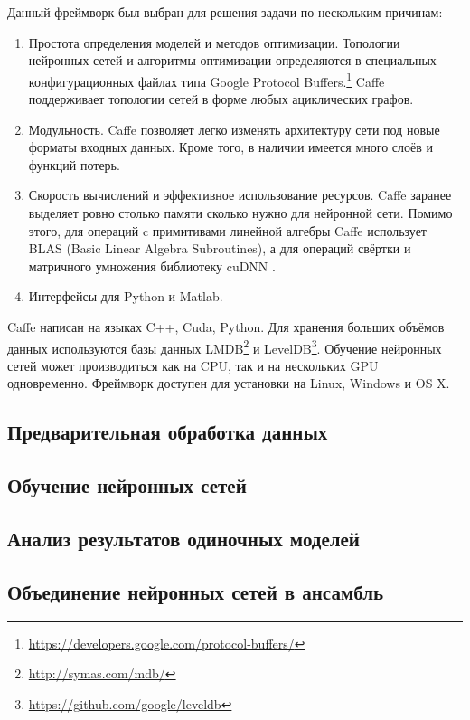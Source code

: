 Данный фреймворк был выбран для решения задачи по нескольким причинам:
\begin{enumerate}
    \item Простота определения моделей и методов оптимизации. Топологии нейронных сетей и алгоритмы оптимизации определяются в 
    специальных конфигурационных файлах типа Google Protocol 
    Buffers.\footnote{\url{https://developers.google.com/protocol-buffers/}} Caffe поддерживает топологии сетей в форме любых 
    ациклических графов.
    \item Модульность. Caffe позволяет легко изменять архитектуру сети под новые форматы входных данных. Кроме того, в наличии 
    имеется много слоёв и функций потерь.
    \item Скорость вычислений и эффективное использование ресурсов. Caffe заранее выделяет ровно столько памяти сколько нужно для 
    нейронной сети. Помимо этого, для операций c примитивами линейной алгебры Caffe использует BLAS (Basic Linear Algebra 
    Subroutines), а для операций свёртки и матричного умножения библиотеку cuDNN \cite{DBLP:journals/corr/ChetlurWVCTCS14}. 
    \item Интерфейсы для Python и Matlab.
\end{enumerate}

Caffe написан на языках C++, Cuda, Python. Для хранения больших объёмов данных используются базы данных 
LMDB\footnote{\url{http://symas.com/mdb/}} и LevelDB\footnote{\url{https://github.com/google/leveldb}}. Обучение нейронных сетей 
может производиться как на CPU, так и на нескольких GPU одновременно. Фреймворк доступен для установки на Linux, Windows и OS X.
\subsection{Предварительная обработка данных}
\subsection{Обучение нейронных сетей}
\subsection{Анализ результатов одиночных моделей}
\subsection{Объединение нейронных сетей в ансамбль}